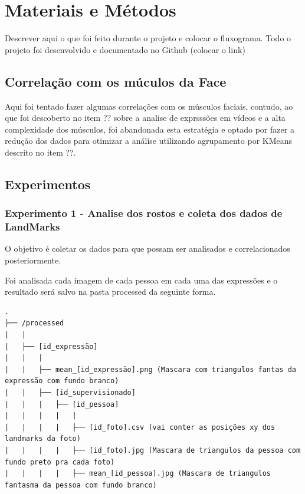 \section{Materiais e Métodos}
\label{sec:materiais}

Descrever aqui o que foi feito durante o projeto e colocar o fluxograma.
Todo o projeto foi desenvolvido e documentado no Github (colocar o link)

\subsection{Correlação com os múculos da Face}
Aqui foi tentado fazer algumas correlações com os músculos faciais, contudo, ao que foi descoberto no item ?? sobre a analise de exprsssões em vídeos e a alta complexidade dos músculos, foi abandonada esta estratégia e optado por fazer a redução dos dados para otimizar a análise utilizando agrupamento por KMeans descrito no item ??.

\subsection{Experimentos}
\subsubsection{Experimento 1 - Analise dos rostos e coleta dos dados de LandMarks}
O objetivo é coletar os dados para que possam ser analisados e correlacionados posteriormente.

Foi analisada cada imagem de cada pessoa em cada uma das expressões e o resultado será salvo na pasta processed da seguinte forma.
\begin{verbatim}
.
├── /processed
|   |
|   ├── [id_expressão]
|   |   |
|   |   ├── mean_[id_expressão].png (Mascara com triangulos fantas da expressão com fundo branco)
|   |   ├── [id_supervisionado]
|   |   |   ├── [id_pessoa]
|   |   |   |   |
|   |   |   |   ├── [id_foto].csv (vai conter as posições xy dos landmarks da foto)
|   |   |   |   ├── [id_foto].jpg (Mascara de triangulos da pessoa com fundo preto pra cada foto)
|   |   |   |   ├── mean_[id_pessoa].jpg (Mascara de triangulos fantasma da pessoa com fundo branco)

\end{verbatim}

